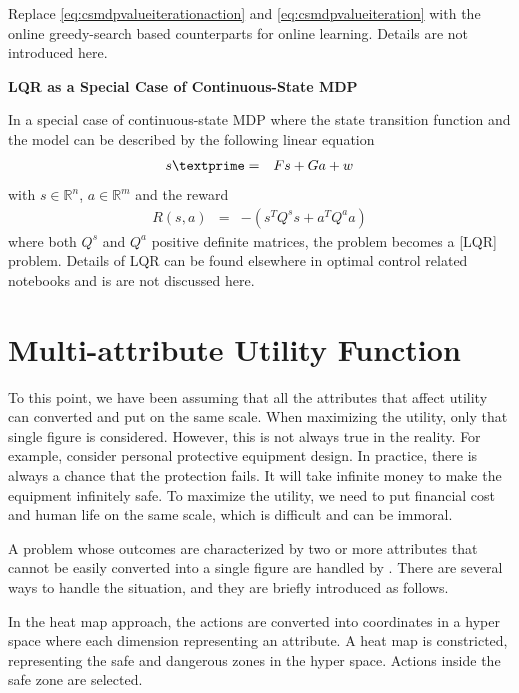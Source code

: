 Replace \eqref{eq:csmdpvalueiterationaction} and \eqref{eq:csmdpvalueiteration} with the online greedy-search based counterparts for online learning. Details are not introduced here.

\begin{mdframed}
\noindent \textbf{LQR as a Special Case of Continuous-State MDP}

In a special case of continuous-state MDP where the state transition function and the model can be described by the following linear equation
\begin{eqnarray}
	s\textprime &=& Fs + Ga + w \nonumber
\end{eqnarray}
with $s\in \mathbb{R}^n$, $a\in \mathbb{R}^m$ and the reward
\begin{eqnarray}
	R(s,a) &=& -\left(s^TQ^ss + a^TQ^aa\right) \nonumber 
\end{eqnarray}
where both $Q^s$ and $Q^a$ positive definite matrices, the problem becomes a [LQR] problem. Details of LQR can be found elsewhere in optimal control related notebooks and is are not discussed here. 

\end{mdframed}

\section{Multi-attribute Utility Function}

To this point, we have been assuming that all the attributes that affect utility can converted and put on the same scale. When maximizing the utility, only that single figure is considered. However, this is not always true in the reality. For example, consider personal protective equipment design. In practice, there is always a chance that the protection fails. It will take infinite money to make the equipment infinitely safe. To maximize the utility, we need to put financial cost and human life on the same scale, which is difficult and can be immoral.

A problem whose outcomes are characterized by two or more attributes that cannot be easily converted into a single figure are handled by . There are several ways to handle the situation, and they are briefly introduced as follows.

In the heat map approach, the actions are converted into coordinates in a hyper space where each dimension representing an attribute. A heat map is constricted, representing the safe and dangerous zones in the hyper space. Actions inside the safe zone are selected.

